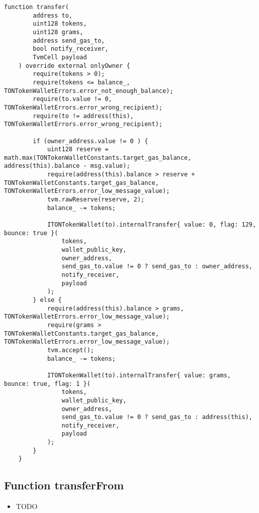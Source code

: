 \begin{lstlisting}[firstnumber=262]
    function transfer(
        address to,
        uint128 tokens,
        uint128 grams,
        address send_gas_to,
        bool notify_receiver,
        TvmCell payload
    ) override external onlyOwner {
        require(tokens > 0);
        require(tokens <= balance_, TONTokenWalletErrors.error_not_enough_balance);
        require(to.value != 0, TONTokenWalletErrors.error_wrong_recipient);
        require(to != address(this), TONTokenWalletErrors.error_wrong_recipient);

        if (owner_address.value != 0 ) {
            uint128 reserve = math.max(TONTokenWalletConstants.target_gas_balance, address(this).balance - msg.value);
            require(address(this).balance > reserve + TONTokenWalletConstants.target_gas_balance, TONTokenWalletErrors.error_low_message_value);
            tvm.rawReserve(reserve, 2);
            balance_ -= tokens;

            ITONTokenWallet(to).internalTransfer{ value: 0, flag: 129, bounce: true }(
                tokens,
                wallet_public_key,
                owner_address,
                send_gas_to.value != 0 ? send_gas_to : owner_address,
                notify_receiver,
                payload
            );
        } else {
            require(address(this).balance > grams, TONTokenWalletErrors.error_low_message_value);
            require(grams > TONTokenWalletConstants.target_gas_balance, TONTokenWalletErrors.error_low_message_value);
            tvm.accept();
            balance_ -= tokens;

            ITONTokenWallet(to).internalTransfer{ value: grams, bounce: true, flag: 1 }(
                tokens,
                wallet_public_key,
                owner_address,
                send_gas_to.value != 0 ? send_gas_to : address(this),
                notify_receiver,
                payload
            );
        }
    }
\end{lstlisting}

\subsection{Function transferFrom}

\noindent\begin{itemize}
\item TODO
\end{itemize}

